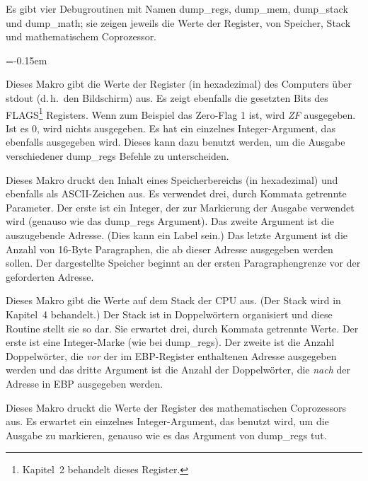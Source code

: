 Es gibt vier Debugroutinen mit Namen {\code dump\_regs}, {\code
dump\_mem}, {\code dump\_stack} und {\code dump\_math}; sie zeigen
jeweils die Werte der Register, von Speicher, Stack und
mathematischem Coprozessor.
\begin{description}
\parskip=-0.15em %

\item[dump\_regs]
 Dieses Makro gibt die Werte
der Register (in hexadezimal) des Computers \"{u}ber {\code stdout}
(d.\,h.\ den Bildschirm) aus. Es zeigt ebenfalls die gesetzten Bits
des FLAGS\footnote{Kapitel~2 behandelt dieses Register.} Registers.
Wenn zum Beispiel das Zero-Flag 1 ist, wird \emph{ZF} ausgegeben.
Ist es 0, wird nichts ausgegeben. Es hat ein einzelnes
Integer-Argument, das ebenfalls ausgegeben wird. Dieses kann dazu
benutzt werden, um die Ausgabe verschiedener {\code dump\_regs}
Befehle zu unterscheiden.

\item[dump\_mem]
 Dieses Makro druckt den Inhalt
eines Speicherbereichs (in hexadezimal) und ebenfalls als
ASCII-Zeichen aus. Es verwendet drei, durch Kommata getrennte
Parameter. Der erste ist ein Integer, der zur Markierung der Ausgabe
verwendet wird (genauso wie das {\code dump\_regs} Argument). Das
zweite Argument ist die auszugebende Adresse. (Dies kann ein Label
sein.) Das letzte Argument ist die Anzahl von 16-Byte Paragraphen,
die ab dieser Adresse ausgegeben werden sollen. Der dargestellte
Speicher beginnt an der ersten Paragraphengrenze vor der geforderten
Adresse.

\item[dump\_stack]
 Dieses Makro gibt die Werte
auf dem Stack der CPU aus. (Der Stack wird in Kapitel~4 behandelt.)
Der Stack ist in Doppelw\"{o}rtern organisiert und diese Routine stellt
sie so dar. Sie erwartet drei, durch Kommata getrennte Werte. Der
erste ist eine Integer-Marke (wie bei {\code dump\_regs}). Der zweite
ist die Anzahl Doppelw\"{o}rter, die \emph{vor} der im  {\code
EBP}-Register enthaltenen Adresse ausgegeben werden und das dritte
Argument ist die Anzahl der Doppelw\"{o}rter, die \emph{nach} der
Adresse in {\code EBP} ausgegeben werden.

\item[dump\_math]
 Dieses Makro druckt die Werte
der Register des mathematischen Coprozessors aus. Es erwartet ein
einzelnes Integer-Argument, das benutzt wird, um die Ausgabe zu
markieren, genauso wie es das Argument von {\code dump\_regs} tut.
\end{description}

